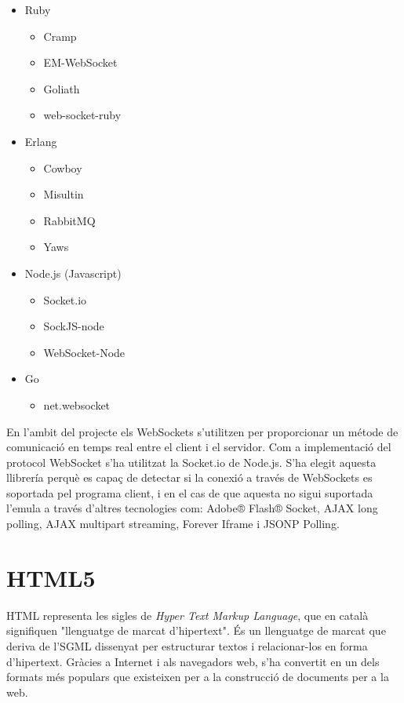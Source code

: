 \begin{itemize}
{    }
    \item{Ruby
    \begin{itemize}
        \item{Cramp}
        \item{EM-WebSocket}
        \item{Goliath}
        \item{web-socket-ruby}
    \end{itemize}
    }
    \item{Erlang
    \begin{itemize}
        \item{Cowboy}
        \item{Misultin}
        \item{RabbitMQ}
        \item{Yaws}
    \end{itemize}
    }
    \item{Node.js (Javascript)
    \begin{itemize}
        \item{Socket.io}
        \item{SockJS-node}
        \item{WebSocket-Node}
    \end{itemize}
    }
    \item{Go
    \begin{itemize}
        \item{net.websocket}
    \end{itemize}
    }
\end{itemize}    

En l'ambit del projecte els WebSockets s'utilitzen per proporcionar un métode de comunicació en temps real entre el client i el servidor. Com a implementació del protocol WebSocket s'ha utilitzat la Socket.io de Node.js. S'ha elegit aquesta llibrería perquè es capaç de detectar si la conexió a través de WebSockets es soportada pel programa client, i en el cas de que aquesta no sigui suportada l'emula a través d'altres tecnologies com:  Adobe® Flash® Socket,  AJAX long polling, AJAX multipart streaming, Forever Iframe i JSONP Polling.



\section{HTML5}

HTML representa les sigles de \emph{Hyper Text Markup Language}, que en català signifiquen "llenguatge de marcat d'hipertext". És un llenguatge de marcat que deriva de l'SGML dissenyat per estructurar textos i relacionar-los en forma d'hipertext. Gràcies a Internet i als navegadors web, s'ha convertit en un dels formats més populars que existeixen per a la construcció de documents per a la web. 

